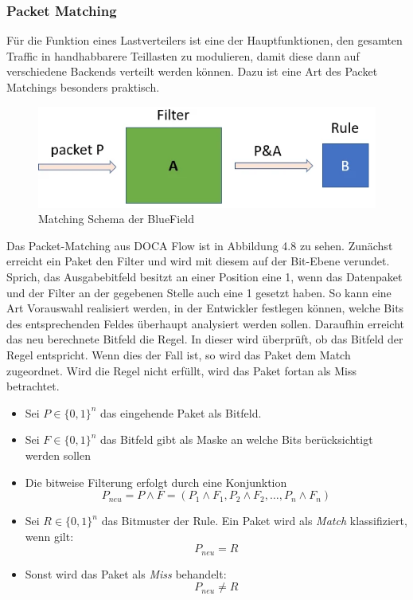 \subsubsection{Packet Matching}
Für die Funktion eines Lastverteilers ist eine der Hauptfunktionen, den gesamten Traffic in handhabbarere Teillasten zu modulieren, damit diese dann auf verschiedene Backends verteilt werden können. Dazu ist eine Art des Packet Matchings besonders praktisch. 
\begin{figure}
    \centering
    \includegraphics[width=1\linewidth]{images/paketmatchng.png}
    \caption{Matching Schema der BlueField}
    \label{fig:enter-label}
\end{figure}
Das Packet-Matching aus DOCA Flow ist in Abbildung 4.8 zu sehen. Zunächst erreicht ein Paket den Filter und wird mit diesem auf der Bit-Ebene verundet. Sprich, das Ausgabebitfeld besitzt an einer Position eine 1, wenn das Datenpaket und der Filter an der gegebenen Stelle auch eine 1 gesetzt haben. So kann eine Art Vorauswahl realisiert werden, in der Entwickler festlegen können, welche Bits des entsprechenden Feldes überhaupt analysiert werden sollen. Daraufhin erreicht das neu berechnete Bitfeld die Regel. In dieser wird überprüft, ob das Bitfeld der Regel entspricht. Wenn dies der Fall ist, so wird das Paket dem Match zugeordnet. Wird die Regel nicht erfüllt, wird das Paket fortan als Miss betrachtet.
\begin{itemize}
  \item Sei $P \in \{0,1\}^n$ das eingehende Paket als Bitfeld.
  \item Sei $F \in \{0,1\}^n$ das Bitfeld gibt als Maske an welche Bits berücksichtigt werden sollen
  \item Die bitweise Filterung erfolgt durch eine Konjunktion  
  \[
    P_{neu} = P \land F = (P_1 \land F_1, P_2 \land F_2, \dots, P_n \land F_n)
  \]
  \item Sei $R \in \{0,1\}^n$ das Bitmuster der Rule. Ein Paket wird als \emph{Match} klassifiziert, wenn gilt:
  \[
    P_{neu} = R
  \]
  \item Sonst wird das Paket als \emph{Miss} behandelt:
  \[
    P_{neu} \ne R
  \]
\end{itemize}

